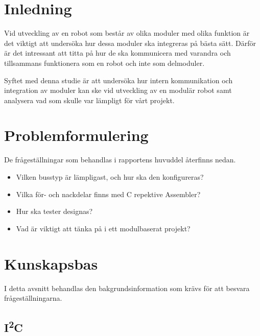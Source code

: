 \documentclass[11pt]{article}
\begin{document}
\begin{flushleft}

\section{Inledning}
Vid utveckling av en robot som består av olika moduler med olika funktion är det viktigt att undersöka hur dessa moduler ska integreras på bästa sätt. Därför är det intressant att titta på hur de ska kommunicera med varandra och tillsammans funktionera som en robot och inte som delmoduler. 


Syftet med denna studie är att undersöka hur intern kommunikation och integration av moduler kan ske vid utveckling av en modulär robot samt analysera vad som skulle var lämpligt för vårt projekt. 


\section{Problemformulering}
De frågeställningar som behandlas i rapportens huvuddel återfinns nedan.

\begin{itemize}
	\item Vilken busstyp är lämpligast, och hur ska den konfigureras?
	\item Vilka för- och nackdelar finns med C repektive Assembler?
	\item Hur ska tester designas?
	\item Vad är viktigt att tänka på i ett modulbaserat projekt?
\end{itemize}

\pagebreak

\section{Kunskapsbas}
I detta avsnitt behandlas den bakgrundsinformation som krävs för att besvara frågeställningarna.

\subsection{I\textsuperscript{2}C}


\end{flushleft}
\end{document}
